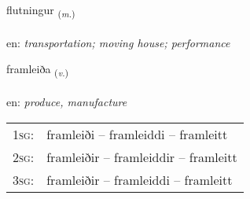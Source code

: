 \documentclass[frontgrid, backgrid]{flacards}\usepackage[]{graphicx}\usepackage[]{color}
\begin{document}
\renewcommand{\flhead}{\vskip5pt \fboxsep=0pt {\small\bfseries\footnotesize Nafnorð | Noun}}
\renewcommand{\fcfoot}{\vskip5pt \fboxsep=0pt \hspace{2pt}{\small\bfseries\footnotesize 2K}}

\renewcommand{\blhead}{\vskip5pt {\small\bfseries\footnotesize Nafnorð | Noun }}
\renewcommand{\bcfoot}{\vskip5pt \hspace{2pt}{\small\bfseries\footnotesize 2K}}


{flutningur \small{\textsubscript{(\textit{m.})}} \\[1ex] %
\textphonetic{[flʏhtniŋkʏr]} \\
en: \emph{transportation; moving house; performance} \\  [2ex]
\renewcommand*{\arraystretch}{0.8}
}

\renewcommand{\flhead}{\vskip5pt \fboxsep=0pt {\small\bfseries\footnotesize Sagnorð | Verb}}
\renewcommand{\fcfoot}{\vskip5pt \fboxsep=0pt \hspace{2pt}{\small\bfseries\footnotesize 2K}}

\renewcommand{\blhead}{\vskip5pt {\small\bfseries\footnotesize Sagnorð | Verb }}
\renewcommand{\bcfoot}{\vskip5pt \hspace{2pt}{\small\bfseries\footnotesize 2K}}


{framleiða \small{\textsubscript{(\textit{v.})}} \\[1ex] %
\textphonetic{[framleiða]} \\
en: \emph{produce, manufacture} \\  [2ex]
\renewcommand*{\arraystretch}{0.8}
\begin{tabular}{p{1cm}l}
\textsc{1sg}: & framleiði -- framleiddi -- framleitt \\ 
\textsc{2sg}: & framleiðir -- framleiddir -- framleitt \\ 
\textsc{3sg}: & framleiðir -- framleiddi -- framleitt \\ 
\end{tabular}
}
\end{document}
